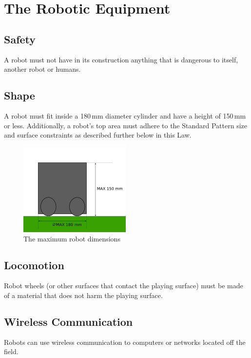 \section{The Robotic Equipment}\label{sec:robotic-equipment}

\subsection{Safety}
A robot must not have in its construction anything that is dangerous to itself, another robot\added{,} or humans.

\subsection{Shape}
A robot must fit inside a 180\,mm diameter cylinder and have a height of 150\,mm or less.
Additionally, a robot's top area must adhere to the Standard Pattern size and surface constraints as described further below in this Law.

\begin{figure}[ht] %
	\centering
	\includegraphics[width=0.5\columnwidth]{img/robot_size.png}
	\caption{The maximum robot dimensions}
	\label{fig:robotdimension}
\end{figure}

\subsection{Locomotion}
Robot wheels (or other surfaces that contact the playing surface) must be made of a material that does not harm the playing surface.

\subsection{Wireless Communication}
Robots can use wireless communication to computers or networks located off the field.


